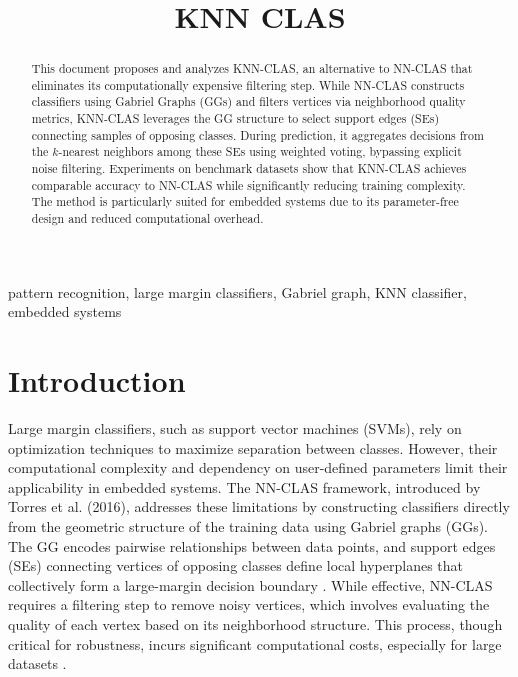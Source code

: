 \documentclass[conference]{IEEEtran}
\begin{document}
\title{KNN CLAS}

\author{
}

\maketitle

\begin{abstract}
    This document proposes and analyzes KNN-CLAS, an alternative to NN-CLAS that eliminates its computationally expensive filtering step. While NN-CLAS constructs classifiers using Gabriel Graphs (GGs) and filters vertices via neighborhood quality metrics, KNN-CLAS leverages the GG structure to select support edges (SEs) connecting samples of opposing classes. During prediction, it aggregates decisions from the \( k \)-nearest neighbors among these SEs using weighted voting, bypassing explicit noise filtering. Experiments on benchmark datasets show that KNN-CLAS achieves comparable accuracy to NN-CLAS while significantly reducing training complexity. The method is particularly suited for embedded systems due to its parameter-free design and reduced computational overhead.
\end{abstract}

\begin{IEEEkeywords}
pattern recognition, large margin classifiers, Gabriel graph, KNN classifier, embedded systems
\end{IEEEkeywords}

\section{Introduction}

Large margin classifiers, such as support vector machines (SVMs), rely on optimization techniques to maximize separation between classes. However, their computational complexity and dependency on user-defined parameters limit their applicability in embedded systems. The NN-CLAS framework, introduced by Torres et al. (2016), addresses these limitations by constructing classifiers directly from the geometric structure of the training data using Gabriel graphs (GGs). The GG encodes pairwise relationships between data points, and support edges (SEs) connecting vertices of opposing classes define local hyperplanes that collectively form a large-margin decision boundary \cite{torres2016}. While effective, NN-CLAS requires a filtering step to remove noisy vertices, which involves evaluating the quality of each vertex based on its neighborhood structure. This process, though critical for robustness, incurs significant computational costs, especially for large datasets \cite{souza2019, arias2021}.
\end{document}
